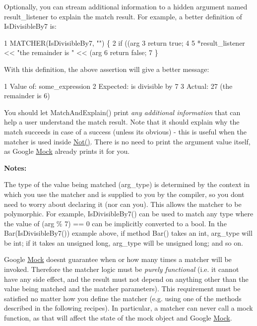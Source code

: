Optionally, you can stream additional information to a hidden argument named {\ttfamily result\+\_\+listener} to explain the match result. For example, a better definition of {\ttfamily Is\+Divisible\+By7} is\+: 
\begin{DoxyCode}
1 MATCHER(IsDivisibleBy7, "") \{
2   if ((arg %
3     return true;
4 
5   *result\_listener << "the remainder is " << (arg %
6   return false;
7 \}
\end{DoxyCode}


With this definition, the above assertion will give a better message\+: 
\begin{DoxyCode}
1 Value of: some\_expression
2 Expected: is divisible by 7
3   Actual: 27 (the remainder is 6)
\end{DoxyCode}


You should let {\ttfamily Match\+And\+Explain()} print {\itshape any additional information} that can help a user understand the match result. Note that it should explain why the match succeeds in case of a success (unless it\textquotesingle{}s obvious) -\/ this is useful when the matcher is used inside {\ttfamily \hyperlink{namespacetesting_a3d7d0dda7e51b13fe2f5aa28e23ed6b6}{Not()}}. There is no need to print the argument value itself, as Google \hyperlink{class_mock}{Mock} already prints it for you.

{\bfseries Notes\+:}


\begin{DoxyEnumerate}
\item The type of the value being matched ({\ttfamily arg\+\_\+type}) is determined by the context in which you use the matcher and is supplied to you by the compiler, so you don\textquotesingle{}t need to worry about declaring it (nor can you). This allows the matcher to be polymorphic. For example, {\ttfamily Is\+Divisible\+By7()} can be used to match any type where the value of {\ttfamily (arg \% 7) == 0} can be implicitly converted to a {\ttfamily bool}. In the {\ttfamily Bar(\+Is\+Divisible\+By7())} example above, if method {\ttfamily Bar()} takes an {\ttfamily int}, {\ttfamily arg\+\_\+type} will be {\ttfamily int}; if it takes an {\ttfamily unsigned long}, {\ttfamily arg\+\_\+type} will be {\ttfamily unsigned long}; and so on.
\end{DoxyEnumerate}
\begin{DoxyEnumerate}
\item Google \hyperlink{class_mock}{Mock} doesn\textquotesingle{}t guarantee when or how many times a matcher will be invoked. Therefore the matcher logic must be {\itshape purely functional} (i.\+e. it cannot have any side effect, and the result must not depend on anything other than the value being matched and the matcher parameters). This requirement must be satisfied no matter how you define the matcher (e.\+g. using one of the methods described in the following recipes). In particular, a matcher can never call a mock function, as that will affect the state of the mock object and Google \hyperlink{class_mock}{Mock}.
\end{DoxyEnumerate}

